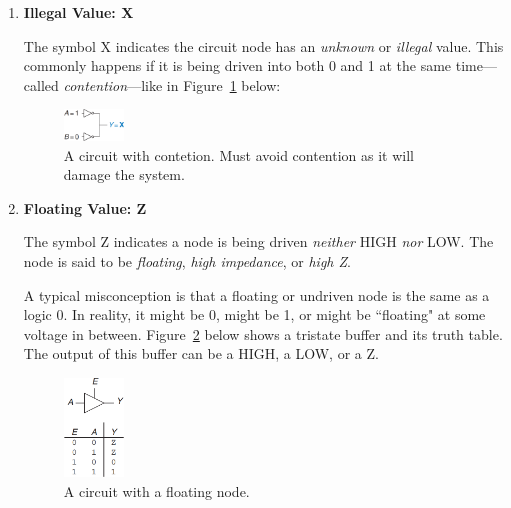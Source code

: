 \documentclass[12pt]{article}
\begin{document}
\begin{enumerate}
    \item \textbf{Illegal Value: X}

    The symbol X indicates the circuit node has an \textit{unknown} or \textit{illegal} value. This commonly happens if it is being driven into both 0 and 1 at the same time---called \textit{contention}---like in Figure~\ref{figure:3} below:

    \begin{figure}[h!]
        \centering
        \includegraphics[width=0.15\textwidth]{circuit_with_contention.png}
        \caption{A circuit with contetion. Must avoid contention as it will damage the system.}
        \label{figure:3}
    \end{figure}

    \item \textbf{Floating Value: Z}

    The symbol Z indicates a node is being driven \textit{neither} HIGH \textit{nor} LOW. The node is said to be \textit{floating}, \textit{high impedance}, or \textit{high Z}.

    A typical misconception is that a floating or undriven node is the same as a logic 0. In reality, it might be 0, might be 1, or might be ``floating" at some voltage in between. Figure~\ref{figure:4} below shows a tristate buffer and its truth table. The output of this buffer can be a HIGH, a LOW, or a Z.

    \begin{figure}[h!]
        \centering
        \includegraphics[width=0.15\textwidth]{circuit_with_floating.png}
        \caption{A circuit with a floating node.}
        \label{figure:4}
    \end{figure}
\end{enumerate}

\end{document}
